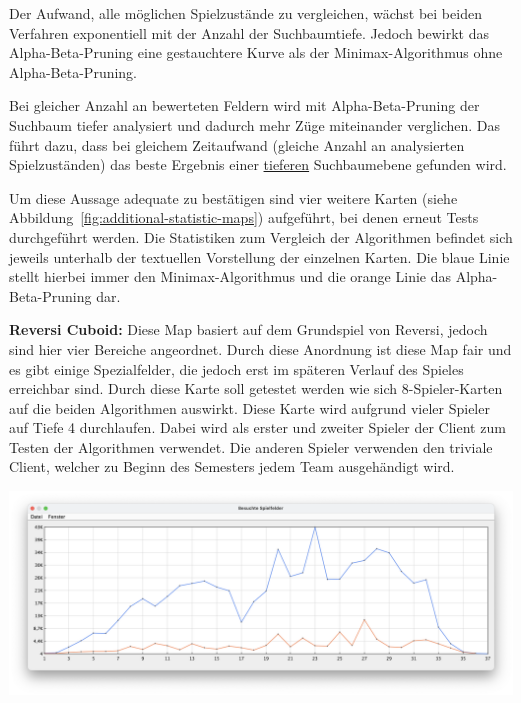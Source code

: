 Der Aufwand, alle m\"oglichen Spielzust\"ande zu vergleichen, w\"achst bei beiden Verfahren exponentiell mit der Anzahl der Suchbaumtiefe.
Jedoch bewirkt das Alpha-Beta-Pruning eine gestauchtere Kurve als der Minimax-Algorithmus ohne Alpha-Beta-Pruning.

Bei gleicher Anzahl an bewerteten Feldern wird mit Alpha-Beta-Pruning der Suchbaum tiefer analysiert und dadurch mehr Z\"uge miteinander verglichen.
Das f\"uhrt dazu, dass bei gleichem Zeitaufwand (\corresponds gleiche Anzahl an analysierten Spielzust\"anden) das beste Ergebnis einer \underline{tieferen} Suchbaumebene gefunden wird.

\newpage

Um diese Aussage adequate zu best\"atigen sind vier weitere Karten (siehe Abbildung~\ref{fig:additional-statistic-maps}) aufgef\"uhrt, bei denen erneut Tests durchgef\"uhrt werden.
Die Statistiken zum Vergleich der Algorithmen befindet sich jeweils unterhalb der textuellen Vorstellung der einzelnen Karten.
Die blaue Linie stellt hierbei immer den Minimax-Algorithmus und die orange Linie das Alpha-Beta-Pruning dar.

\textbf{Reversi Cuboid:}
Diese Map basiert auf dem Grundspiel von Reversi, jedoch sind hier vier Bereiche angeordnet.
Durch diese Anordnung ist diese Map fair und es gibt einige Spezialfelder, die jedoch erst im sp\"ateren Verlauf des Spieles erreichbar sind.
Durch diese Karte soll getestet werden wie sich 8-Spieler-Karten auf die beiden Algorithmen auswirkt.
Diese Karte wird aufgrund vieler Spieler auf Tiefe 4 durchlaufen.
Dabei wird als erster und zweiter Spieler der Client zum Testen der Algorithmen verwendet.
Die anderen Spieler verwenden den triviale Client, welcher zu Beginn des Semesters jedem Team ausgeh\"andigt wird.

\begin{minipage}{\linewidth}
    \centering
    \includegraphics[width=0.9\linewidth]{statistic/CUBOID-01/ST-01-D4-LD}
    \label{fig:statistic-graph-cuboid}
\end{minipage}
\vspace{1em}

